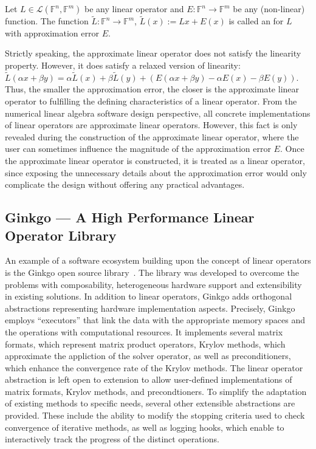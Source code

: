 \begin{definition}
\label{conclusion:def:apprximate-linop}
Let $L \in \mathcal{L}(\mathbb{F}^n,\mathbb{F}^m)$ be any linear operator and $E
: \mathbb{F}^n \rightarrow \mathbb{F}^m$ be any (non-linear) function.
The function $\widetilde{L} : \mathbb{F}^n \rightarrow \mathbb{F}^m$,
$\widetilde{L}(x) := Lx + E(x)$ is called an  for $L$ with approximation error $E$.
\end{definition}

Strictly speaking, the approximate linear operator does not satisfy the linearity
property. However, it does satisfy a relaxed version of linearity:
$\widetilde{L}(\alpha x + \beta y) = \alpha \widetilde{L}(x) + \beta
\widetilde{L}(y) + (E(\alpha x + \beta y) - \alpha E(x) - \beta E(y))$. Thus,
the smaller the approximation error, the closer is the approximate linear
operator to fulfilling the defining characteristics of a linear operator. From
the numerical linear algebra software design perspective, all concrete
implementations of linear operators are approximate linear operators. However,
this fact is only revealed during the construction of the approximate linear
operator, where the user can sometimes influence the magnitude of the
approximation error $E$. Once the approximate linear operator is constructed, it
is treated as a linear operator, since exposing the unnecessary details about
the approximation error would only complicate the design without offering any
practical advantages.


\subsection{Ginkgo --- A High Performance Linear Operator Library}

An example of a software ecosystem building upon the concept of linear operators
is the Ginkgo open source library~\cite{ginkgo}. The library was developed to
overcome the problems with composability, heterogeneous hardware support and
extensibility in existing solutions. In addition to linear operators, Ginkgo
adds orthogonal abstractions representing hardware implementation aspects.
Precisely, Ginkgo employs ``executors'' that link the data with the appropriate
memory spaces and the operations with computational resources. It implements
several matrix formats, which represent matrix product operators, Krylov
methods, which approximate the appliction of the solver operator, as well as
preconditioners, which enhance the convergence rate of the Krylov methods. The
linear operator abstraction is left open to extension to allow user-defined
implementations of matrix formats, Krylov methods, and precondtioners. To
simplify the adaptation of existing methods to specific needs, several other
extensible abstractions are provided. These include the ability to modify the
stopping criteria used to check convergence of iterative methods, as well as
logging hooks, which enable to interactively track the progress of the distinct
operations.

